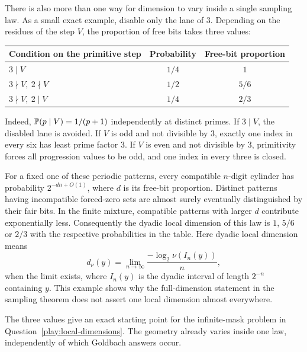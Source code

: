 There is also more than one way for dimension to vary inside a
single sampling law.  As a small exact example, disable only the
lane of $3$.  Depending on the residues of the step $V$, the
proportion of free bits takes three values:
\begin{center}
\begin{tabular}{lcc}
\toprule
Condition on the primitive step & Probability & Free-bit proportion\tabularnewline
\midrule
$3\mid V$ & $1/4$ & $1$\tabularnewline
$3\nmid V,\ 2\nmid V$ & $1/2$ & $5/6$\tabularnewline
$3\nmid V,\ 2\mid V$ & $1/4$ & $2/3$\tabularnewline
\bottomrule
\end{tabular}
\end{center}
Indeed, $\mathbb P(p\mid V)=1/(p+1)$ independently at distinct
primes.  If $3\mid V$, the disabled lane is avoided.  If $V$ is
odd and not divisible by $3$, exactly one index in every six has
least prime factor $3$.  If $V$ is even and not divisible by $3$,
primitivity forces all progression values to be odd, and one index
in every three is closed.

For a fixed one of these periodic patterns, every compatible
$n$-digit cylinder has probability $2^{-dn+O(1)}$, where $d$ is
its free-bit proportion.  Distinct patterns having incompatible
forced-zero sets are almost surely eventually distinguished by
their fair bits.  In the finite mixture, compatible patterns with
larger $d$ contribute exponentially less.  Consequently the
dyadic local dimension of this law is $1$, $5/6$ or $2/3$ with
the respective probabilities in the table.  Here dyadic local
dimension means
\[
 d_\nu(y)=\lim_{n\to\infty}
      \frac{-\log_2\nu(I_n(y))}{n},
\]
when the limit exists, where $I_n(y)$ is the dyadic interval of
length $2^{-n}$ containing $y$.  This example shows why the
full-dimension statement in the sampling theorem does not assert
one local dimension almost everywhere.

The three values give an exact starting point for the infinite-mask
problem in Question~\ref{play:local-dimensions}.  The geometry already
varies inside one law, independently of which Goldbach answers occur.
